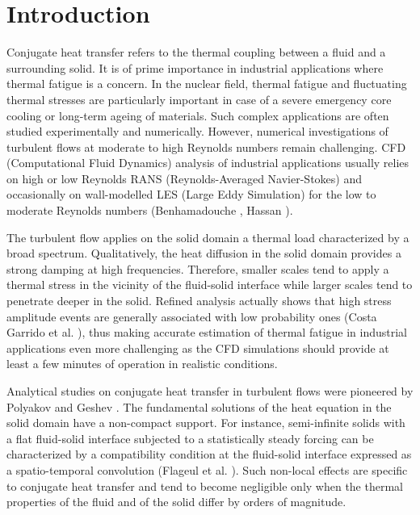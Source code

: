 \documentclass{svjour3}                     %
\begin{document}
\section{Introduction}
\label{sec-introduction}

Conjugate heat transfer refers to the thermal coupling between a fluid and a surrounding solid.
It is of prime importance in industrial applications where thermal fatigue is a concern.
In the nuclear field, thermal fatigue and fluctuating thermal stresses are particularly important in case of a severe emergency core cooling or long-term ageing of materials.
Such complex applications are often studied experimentally and numerically.
However, numerical investigations of turbulent flows at moderate to high Reynolds numbers remain challenging.
CFD (Computational Fluid Dynamics) analysis of industrial applications usually relies on high or low Reynolds RANS (Reynolds-Averaged Navier-Stokes) and occasionally on wall-modelled LES (Large Eddy Simulation) for the low to moderate Reynolds numbers (Benhamadouche \cite{benhamadouche2017ned}, Hassan \cite {hassan2017overview}).

The turbulent flow applies on the solid domain a thermal load characterized by a broad spectrum.
Qualitatively, the heat diffusion in the solid domain provides a strong damping at high frequencies.
Therefore, smaller scales tend to apply a thermal stress in the vicinity of the fluid-solid interface while larger scales tend to penetrate deeper in the solid.
Refined analysis actually shows that high stress amplitude events are generally associated with low probability ones (Costa Garrido et al. \cite{garrido2016uncertainties}), thus making accurate estimation of thermal fatigue in industrial applications even more challenging as the CFD simulations should provide at least a few minutes of operation in realistic conditions.

Analytical studies on conjugate heat transfer in turbulent flows were pioneered by Polyakov \cite{poliakov1974wall} and Geshev \cite{geshev1978influence}.
The fundamental solutions of the heat equation in the solid domain have a non-compact support.
For instance, semi-infinite solids with a flat fluid-solid interface subjected to a statistically steady forcing can be characterized by a compatibility condition at the fluid-solid interface expressed as a spatio-temporal convolution (Flageul et al. \cite{flageul2015dns}).
Such non-local effects are specific to conjugate heat transfer and tend to become negligible only when the thermal properties of the fluid and of the solid differ by orders of magnitude.
\end{document}

